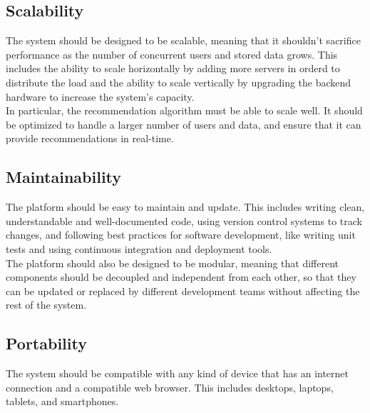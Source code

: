 \subsection{Scalability}
The system should be designed to be scalable, meaning that it shouldn't sacrifice performance as the number of concurrent users and stored data grows.
This includes the ability to scale horizontally by adding more servers in orderd to distribute the load and the ability to scale vertically by upgrading 
the backend hardware to increase the system's capacity. \\
In particular, the recommendation algorithm must be able to scale well. It should be optimized to handle a larger number of users and data, and ensure
that it can provide recommendations in real-time.

\subsection{Maintainability}
The platform should be easy to maintain and update. This includes writing clean, understandable and well-documented code, using version control systems 
to track changes, and following best practices for software development, like writing unit tests and using continuous integration and deployment tools. \\
The platform should also be designed to be modular, meaning that different components should be decoupled and independent from each other, so that
they can be updated or replaced by different development teams without affecting the rest of the system.

\subsection{Portability}
The system should be compatible with any kind of device that has an internet connection and a compatible web browser. This includes desktops, laptops,
tablets, and smartphones.
